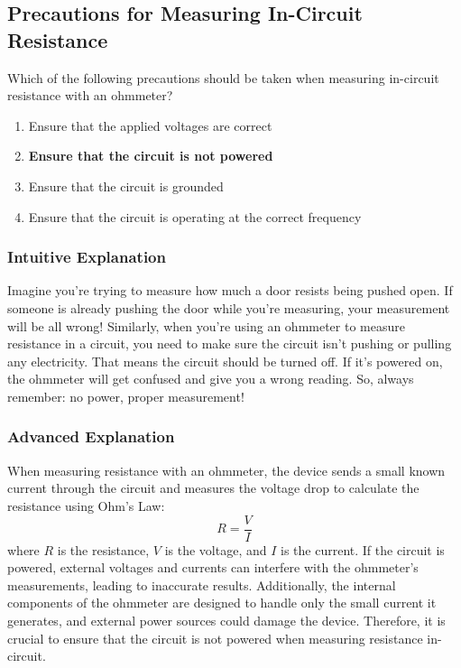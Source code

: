 \subsection{Precautions for Measuring In-Circuit Resistance}
\label{T7D11}

\begin{tcolorbox}[colback=gray!10!white,colframe=black!75!black,title=T7D11]
Which of the following precautions should be taken when measuring in-circuit resistance with an ohmmeter?
\begin{enumerate}[label=\Alph*)]
    \item Ensure that the applied voltages are correct
    \item \textbf{Ensure that the circuit is not powered}
    \item Ensure that the circuit is grounded
    \item Ensure that the circuit is operating at the correct frequency
\end{enumerate}
\end{tcolorbox}

\subsubsection{Intuitive Explanation}
Imagine you're trying to measure how much a door resists being pushed open. If someone is already pushing the door while you're measuring, your measurement will be all wrong! Similarly, when you're using an ohmmeter to measure resistance in a circuit, you need to make sure the circuit isn't pushing or pulling any electricity. That means the circuit should be turned off. If it's powered on, the ohmmeter will get confused and give you a wrong reading. So, always remember: no power, proper measurement!

\subsubsection{Advanced Explanation}
When measuring resistance with an ohmmeter, the device sends a small known current through the circuit and measures the voltage drop to calculate the resistance using Ohm's Law:
\[
R = \frac{V}{I}
\]
where \( R \) is the resistance, \( V \) is the voltage, and \( I \) is the current. If the circuit is powered, external voltages and currents can interfere with the ohmmeter's measurements, leading to inaccurate results. Additionally, the internal components of the ohmmeter are designed to handle only the small current it generates, and external power sources could damage the device. Therefore, it is crucial to ensure that the circuit is not powered when measuring resistance in-circuit.

